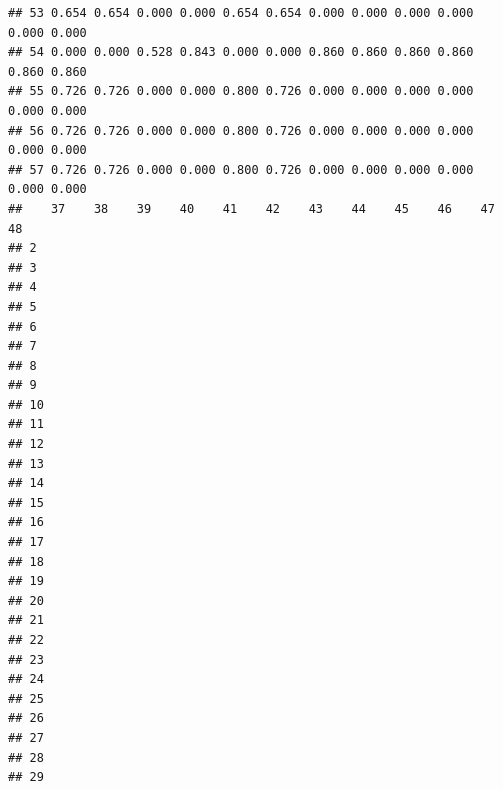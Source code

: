 \documentclass[
]{book}
\begin{document}
\begin{verbatim}
## 53 0.654 0.654 0.000 0.000 0.654 0.654 0.000 0.000 0.000 0.000 0.000 0.000
## 54 0.000 0.000 0.528 0.843 0.000 0.000 0.860 0.860 0.860 0.860 0.860 0.860
## 55 0.726 0.726 0.000 0.000 0.800 0.726 0.000 0.000 0.000 0.000 0.000 0.000
## 56 0.726 0.726 0.000 0.000 0.800 0.726 0.000 0.000 0.000 0.000 0.000 0.000
## 57 0.726 0.726 0.000 0.000 0.800 0.726 0.000 0.000 0.000 0.000 0.000 0.000
##    37    38    39    40    41    42    43    44    45    46    47    48   
## 2                                                                         
## 3                                                                         
## 4                                                                         
## 5                                                                         
## 6                                                                         
## 7                                                                         
## 8                                                                         
## 9                                                                         
## 10                                                                        
## 11                                                                        
## 12                                                                        
## 13                                                                        
## 14                                                                        
## 15                                                                        
## 16                                                                        
## 17                                                                        
## 18                                                                        
## 19                                                                        
## 20                                                                        
## 21                                                                        
## 22                                                                        
## 23                                                                        
## 24                                                                        
## 25                                                                        
## 26                                                                        
## 27                                                                        
## 28                                                                        
## 29                                                                        

\end{verbatim}
\end{document}

